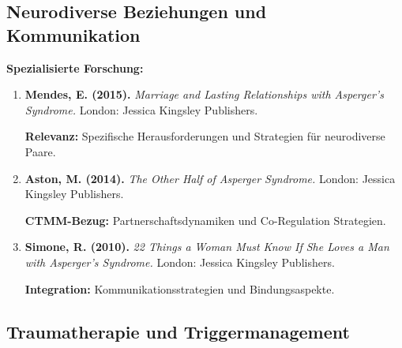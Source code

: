 \subsection{Neurodiverse Beziehungen und Kommunikation}

\begin{ctmmOrangeBox}[title=Autismus und Beziehungen]

\textbf{Spezialisierte Forschung:}
\begin{enumerate}
    \item \textbf{Mendes, E. (2015).} \textit{Marriage and Lasting Relationships with Asperger's Syndrome.} London: Jessica Kingsley Publishers.
    
    \textbf{Relevanz:} Spezifische Herausforderungen und Strategien für neurodiverse Paare.
    
    \item \textbf{Aston, M. (2014).} \textit{The Other Half of Asperger Syndrome.} London: Jessica Kingsley Publishers.
    
    \textbf{CTMM-Bezug:} Partnerschaftsdynamiken und Co-Regulation Strategien.
    
    \item \textbf{Simone, R. (2010).} \textit{22 Things a Woman Must Know If She Loves a Man with Asperger's Syndrome.} London: Jessica Kingsley Publishers.
    
    \textbf{Integration:} Kommunikationsstrategien und Bindungsaspekte.
\end{enumerate}

\end{ctmmOrangeBox}

\subsection{Traumatherapie und Triggermanagement}

